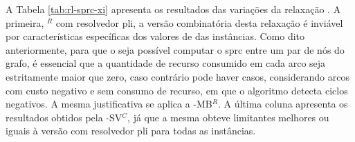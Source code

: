 A Tabela \ref{tab:rl-sprc-xi} apresenta os resultados das variações da relaxação
{\rlt}. A primeira, {\rlt}$^{R}$ com resolvedor \gls{pli}, a versão combinatória
desta  relaxação  é inviável  por  características  específicas dos  valores  de
{\jitter}  das instâncias.  Como dito  anteriormente, para  que o  seja possível
computar o \gls{sprc} entre um par de nós do grafo, é essencial que a quantidade
de  recurso consumido  em  cada  arco seja  estritamente  maior  que zero,  caso
contrário pode haver casos, considerando arcos  com custo negativo e sem consumo
de recurso, em  que o algoritmo detecta ciclos negativos.  A mesma justificativa
se aplica a {\rlt}-MB$^R$. A última  coluna apresenta os resultados obtidos pela
{\rlt}-SV$^C$, já que a mesma obteve  limitantes melhores ou iguais à versão com
resolvedor \gls{pli} para todas as instâncias.

